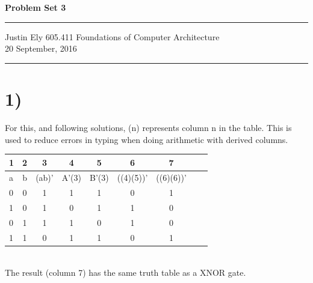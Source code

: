 \documentclass[a4paper,11pt]{article}
\begin{document}
\begin{flushright}

\vspace{1.1cm}

{\bf\Huge Problem Set 3}

\rule{0.25\linewidth}{0.5pt}

\vspace{0.5cm}
Justin Ely
\linebreak
\newline
\footnotesize{605.411 Foundations of Computer Architecture \\}
\vspace{0.5cm}
20 September, 2016
\end{flushright}

\noindent\rule{\linewidth}{1.0pt}


\section*{1)}
For this, and following solutions, (n) represents column n in the table.  This is used to reduce errors in typing when doing
arithmetic with derived columns. \\

\begin{tabular}{| l | c | c | c | c | c | c | c | c |}
  \hline	
    1 & 2 & 3 & 4 & 5 & 6 & 7  \\  \hline \hline
    a & b & (ab)' & A'(3) & B'(3) & ((4)(5))' & ((6)(6))'  \\  \hline \hline
    0 & 0 & 1 & 1 & 1 & 0 & 1  \\  \hline 
    1 & 0 & 1 & 0 & 1 & 1 & 0  \\  \hline 
    0 & 1 & 1 & 1 & 0 & 1 & 0  \\  \hline 
    1 & 1 & 0 & 1 & 1 & 0 & 1  \\  \hline 
\end{tabular} \\

\noindent  The result (column 7) has the same truth table as a XNOR gate.

\end{document}
